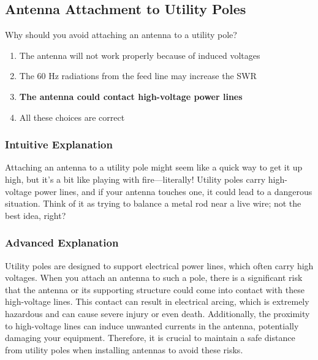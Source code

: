 \subsection{Antenna Attachment to Utility Poles}
\label{T0B09}

\begin{tcolorbox}[colback=gray!10!white,colframe=black!75!black,title=T0B09]
Why should you avoid attaching an antenna to a utility pole?
\begin{enumerate}[noitemsep]
    \item The antenna will not work properly because of induced voltages
    \item The 60 Hz radiations from the feed line may increase the SWR
    \item \textbf{The antenna could contact high-voltage power lines}
    \item All these choices are correct
\end{enumerate}
\end{tcolorbox}

\subsubsection*{Intuitive Explanation}
Attaching an antenna to a utility pole might seem like a quick way to get it up high, but it's a bit like playing with fire—literally! Utility poles carry high-voltage power lines, and if your antenna touches one, it could lead to a dangerous situation. Think of it as trying to balance a metal rod near a live wire; not the best idea, right?

\subsubsection*{Advanced Explanation}
Utility poles are designed to support electrical power lines, which often carry high voltages. When you attach an antenna to such a pole, there is a significant risk that the antenna or its supporting structure could come into contact with these high-voltage lines. This contact can result in electrical arcing, which is extremely hazardous and can cause severe injury or even death. Additionally, the proximity to high-voltage lines can induce unwanted currents in the antenna, potentially damaging your equipment. Therefore, it is crucial to maintain a safe distance from utility poles when installing antennas to avoid these risks.